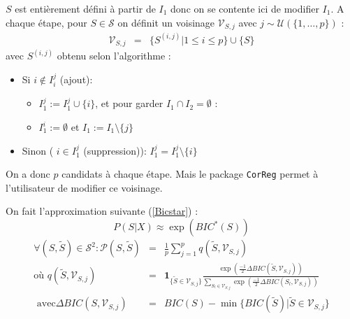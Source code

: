 \documentclass[12pt]{article}
\begin{document}
	$S$ est entièrement défini à partir de $I_1$ donc on se contente ici de modifier $I_1$. %
	A chaque étape, pour $S \in \mathcal{S}$ on définit un voisinage $\mathcal{V}_{S,j}$ avec $j \sim \mathcal{U}(\{1,\dots,p\}) $ :%
	\begin{eqnarray}
		\mathcal{V}_{S,j}&=&\{ S^{(i,j)} | 1\leq i\leq p \} \cup\{S \}
	\end{eqnarray}	
	avec $S^{(i,j)}$ obtenu selon l'algorithme :
	\begin{itemize}
		\item Si $i \notin I_i^j$ (ajout): 
			\begin{itemize}
				\item $I_1^j :=I_1^j\cup \{i\}$, et pour garder $I_1\cap I_2=\emptyset$ :
				\item $I_1^i :=\emptyset$ et $I_1:=I_1 \setminus \{j\}$
			\end{itemize}			 
		\item Sinon ( $i \in I_1^j$ (suppression)): $I_1^j=I_1^j\setminus \{i\}$
	\end{itemize}
	
	On a donc $p$ candidats à chaque étape. Mais le package \texttt{CorReg} permet à l'utilisateur de modifier ce voisinage.
	
		
	On fait l'approximation suivante  (\ref{Bicstar}) : 
	\begin{equation}
		P(S|X)\approx \exp(BIC^*(S))
	\end{equation}
	\begin{eqnarray}
			\forall (S,\tilde{S}) \in \mathcal{S}^2 : \mathcal{P}(S,\tilde{S})&=& \frac{1}{p} \sum_{j=1}^p q(\tilde{S},\mathcal{V}_{S,j}) \\
	\textrm{où }	q(\tilde{S},\mathcal{V}_{S,j})&=&\mathbf{1}_{ \{\tilde{S}\in \mathcal{V}_{S,j}\} }\frac{\exp(\frac{-1}{2}\Delta BIC(\tilde{S},\mathcal{V}_{S,j}))}{\sum_{S_l\in \mathcal{V}_{S,j}}\exp(\frac{-1}{2}\Delta BIC(S_l,\mathcal{V}_{S,j}))} \\
	\textrm{ avec} \Delta BIC(S,\mathcal{V}_{S,j})&=&BIC(S)-\min\{BIC(\tilde{S})| \tilde{S} \in \mathcal{V}_{S,j} \}
	\end{eqnarray}
	
\end{document}

